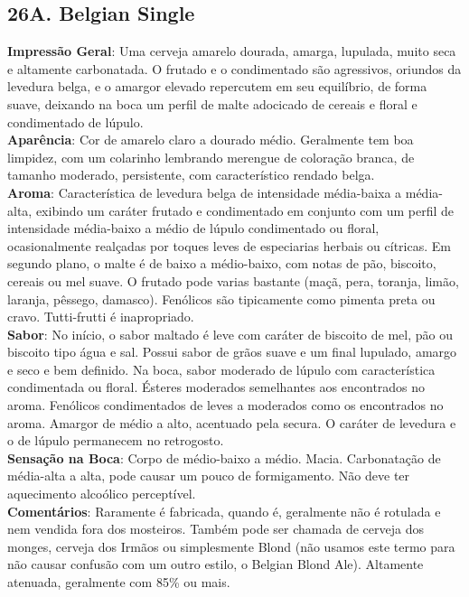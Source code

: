 \subsection*{26A. Belgian Single}
\textbf{Impressão Geral}: Uma cerveja amarelo dourada, amarga, lupulada, muito seca e altamente carbonatada. O frutado e o condimentado são agressivos, oriundos da levedura belga, e o amargor elevado repercutem em seu equilíbrio, de forma suave, deixando na boca um perfil de malte adocicado de cereais e floral e condimentado de lúpulo. \\
\textbf{Aparência}: Cor de amarelo claro a dourado médio. Geralmente tem boa limpidez, com um colarinho lembrando merengue de coloração branca, de tamanho moderado, persistente, com característico rendado belga. \\
\textbf{Aroma}: Característica de levedura belga de intensidade média-baixa a média-alta, exibindo um caráter frutado e condimentado em conjunto com um perfil de intensidade média-baixo a médio de lúpulo condimentado ou floral, ocasionalmente realçadas por toques leves de especiarias herbais ou cítricas. Em segundo plano, o malte é de baixo a médio-baixo, com notas de pão, biscoito, cereais ou mel suave. O frutado pode varias bastante (maçã, pera, toranja, limão, laranja, pêssego, damasco). Fenólicos são tipicamente como pimenta preta ou cravo. Tutti-frutti é inapropriado. \\
\textbf{Sabor}: No início, o sabor maltado é leve com caráter de biscoito de mel, pão ou biscoito tipo água e sal. Possui sabor de grãos suave e um final lupulado, amargo e seco e bem definido. Na boca, sabor moderado de lúpulo com característica condimentada ou floral. Ésteres moderados semelhantes aos encontrados no aroma. Fenólicos condimentados de leves a moderados como os encontrados no aroma. Amargor de médio a alto, acentuado pela secura. O caráter de levedura e o de lúpulo permanecem no retrogosto. \\
\textbf{Sensação na Boca}: Corpo de médio-baixo a médio. Macia. Carbonatação de média-alta a alta, pode causar um pouco de formigamento. Não deve ter aquecimento alcoólico perceptível. \\
\textbf{Comentários}: Raramente é fabricada, quando é, geralmente não é rotulada e nem vendida fora dos mosteiros. Também pode ser chamada de cerveja dos monges, cerveja dos Irmãos ou simplesmente Blond (não usamos este termo para não causar confusão com um outro estilo, o Belgian Blond Ale). Altamente atenuada, geralmente com 85\% ou mais. \\
